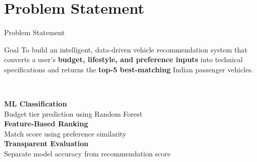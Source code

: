 \documentclass[aspectratio=169]{beamer}
\begin{document}
\section{Problem Statement}
\begin{frame}{Problem Statement}
  \begin{block}{Goal}
    To build an intelligent, data-driven vehicle recommendation system that converts a user's
    \textbf{budget, lifestyle, and preference inputs} into technical specifications and returns
    the \textbf{top-5 best-matching} Indian passenger vehicles.
  \end{block}
  \vspace{1em}
  \begin{columns}[t]
      \centering
      \textcolor{accentblue}{\Large\faRobot}\\[0.3em]
      \textbf{ML Classification}\\
      Budget tier prediction using Random Forest
      \centering
      \textcolor{accentblue}{\Large\faListOl}\\[0.3em]
      \textbf{Feature-Based Ranking}\\
      Match score using preference similarity
      \centering
      \textcolor{accentblue}{\Large\faEye}\\[0.3em]
      \textbf{Transparent Evaluation}\\
      Separate model accuracy from recommendation score
  \end{columns}
\end{frame}

\end{document}
